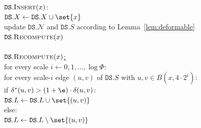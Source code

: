 \documentclass[11pt]{article}
\newcommand{\cN}{\mathcal{N}}
\newcommand{\dist}{\ensuremath{\delta}}
\newcommand{\DS}{\texttt{DS}}
\newcommand{\points}{{\ensuremath{\DS.X}}}
\newcommand{\sparse}{{\ensuremath{\DS.S}}}
\newcommand{\net}{{\ensuremath{\DS.\cN}}}
\newcommand{\light}{{\ensuremath{\DS.L}}}
\begin{document}
\begin{figure}[h!]
\centering
\begin{algorithm}
    \ul{$\texttt{DS}.\textsc{Insert}(x)$}:\+
    \\ $\points \gets \points \cup \set{x}$
    \\ update $\net$ and $\sparse$ according to Lemma~\ref{lem:deformable}
    \\ $\texttt{DS}.\textsc{Recompute}(x)$\-
    \\    
    \\ \ul{$\texttt{DS}.\textsc{Recompute}(x)$:}\+
    \\ for every scale $i \gets 0, 1, \ldots, \log \Phi$:\+
    \\      for every scale-$i$ edge $(u,v)$ of $\sparse$ with $u,v \in B(x, 4 \cdot 2^i)$:\+
    \\          if $\dist^*(u,v) > (1+\e) \cdot \dist(u,v)$:\+
    \\  $\light \gets \light \cup \set{(u,v)}$\-
    \\ else:\+
    \\ $\light \gets \light \setminus \set{(u,v)}$\-
\end{algorithm}
\label{fig:insert-recourse}
\end{figure}
\end{document}
